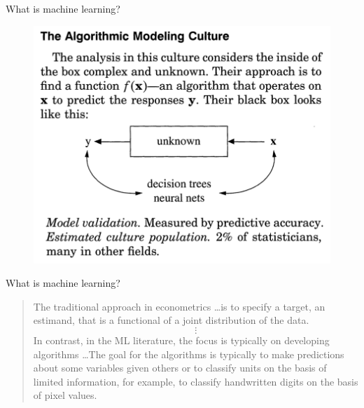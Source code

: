 \documentclass[xcolor={dvipsnames}, handout]{beamer}
\begin{document}
\begin{frame}{What is machine learning?}

\begin{figure}
\centering
\includegraphics{../assets/breiman_2001AM-culture.png}
\end{figure}


\hfill \cite{breiman2001statistical}

\end{frame}





\begin{frame}{What is machine learning?}

\begin{quote}
The traditional approach in econometrics \dots is to specify a target, an estimand, that is a functional of a joint distribution of the data.
$$
\vdots
$$
In contrast, in the ML literature, the focus is typically on developing algorithms \dots The goal for the algorithms is typically to make predictions about some variables given others or to classify units on the basis of limited information, for example, to classify handwritten digits on the basis of pixel values.
\end{quote}

\hfill \cite{athey2019machine}

\end{frame}
\end{document}
